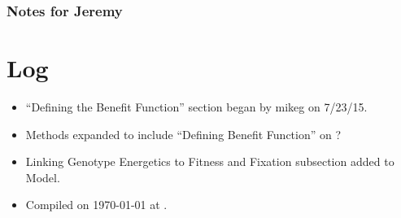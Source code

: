 \documentclass{article}
\begin{document}
\subsubsection*{Notes for Jeremy}

\section*{Log}
\begin{itemize}
\item ``Defining the Benefit Function'' section began by mikeg on 7/23/15.
\item Methods expanded to include ``Defining Benefit Function'' on ?
\item {Linking Genotype Energetics to Fitness and Fixation} subsection added to Model.
\item Compiled on \today\xspace at \currenttime. 
\end{itemize}
\end{document}

